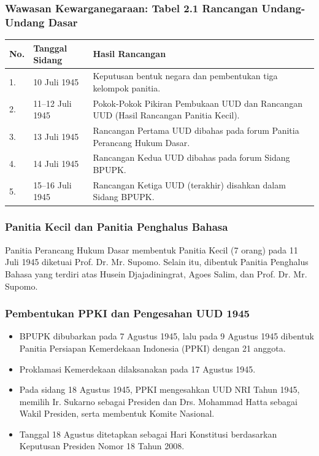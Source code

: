 \subsubsection{Wawasan Kewarganegaraan: Tabel 2.1 Rancangan Undang-Undang Dasar}
\begin{table}[h!]
\centering
\begin{tabular}{|l|l|p{8cm}|}
\hline
\textbf{No.} & \textbf{Tanggal Sidang} & \textbf{Hasil Rancangan} \\ \hline
1. & 10 Juli 1945 & Keputusan bentuk negara dan pembentukan tiga kelompok panitia. \\ \hline
2. & 11--12 Juli 1945 & Pokok-Pokok Pikiran Pembukaan UUD dan Rancangan UUD (Hasil Rancangan Panitia Kecil). \\ \hline
3. & 13 Juli 1945 & Rancangan Pertama UUD dibahas pada forum Panitia Perancang Hukum Dasar. \\ \hline
4. & 14 Juli 1945 & Rancangan Kedua UUD dibahas pada forum Sidang BPUPK. \\ \hline
5. & 15--16 Juli 1945 & Rancangan Ketiga UUD (terakhir) disahkan dalam Sidang BPUPK. \\ \hline
\end{tabular}
\end{table}

\subsubsection{Panitia Kecil dan Panitia Penghalus Bahasa}
Panitia Perancang Hukum Dasar membentuk Panitia Kecil (7 orang) pada 11 Juli 1945 diketuai Prof. Dr. Mr. Supomo. Selain itu, dibentuk Panitia Penghalus Bahasa yang terdiri atas Husein Djajadiningrat, Agoes Salim, dan Prof. Dr. Mr. Supomo.

\subsubsection{Pembentukan PPKI dan Pengesahan UUD 1945}
\begin{itemize}
    \item BPUPK dibubarkan pada 7 Agustus 1945, lalu pada 9 Agustus 1945 dibentuk Panitia Persiapan Kemerdekaan Indonesia (PPKI) dengan 21 anggota.
    \item Proklamasi Kemerdekaan dilaksanakan pada 17 Agustus 1945.
    \item Pada sidang 18 Agustus 1945, PPKI mengesahkan UUD NRI Tahun 1945, memilih Ir. Sukarno sebagai Presiden dan Drs. Mohammad Hatta sebagai Wakil Presiden, serta membentuk Komite Nasional.
    \item Tanggal 18 Agustus ditetapkan sebagai Hari Konstitusi berdasarkan Keputusan Presiden Nomor 18 Tahun 2008.
\end{itemize}

